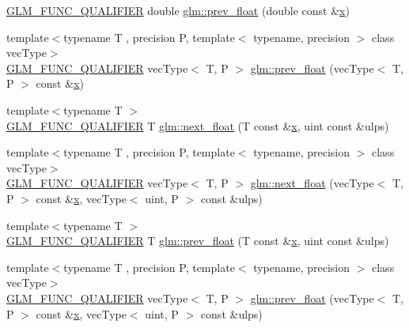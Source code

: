 \begin{DoxyCompactItemize}
\item 
\mbox{\hyperlink{setup_8hpp_a33fdea6f91c5f834105f7415e2a64407}{G\+L\+M\+\_\+\+F\+U\+N\+C\+\_\+\+Q\+U\+A\+L\+I\+F\+I\+ER}} double \mbox{\hyperlink{namespaceglm_a82cdd5674b80569f118b33a6a327c9bd}{glm\+::prev\+\_\+float}} (double const \&\mbox{\hyperlink{glad_8h_a92d0386e5c19fb81ea88c9f99644ab1d}{x}})
\item 
{\footnotesize template$<$typename T , precision P, template$<$ typename, precision $>$ class vec\+Type$>$ }\\\mbox{\hyperlink{setup_8hpp_a33fdea6f91c5f834105f7415e2a64407}{G\+L\+M\+\_\+\+F\+U\+N\+C\+\_\+\+Q\+U\+A\+L\+I\+F\+I\+ER}} vec\+Type$<$ T, P $>$ \mbox{\hyperlink{namespaceglm_a90916626e6b0ed925938226f31b38c6b}{glm\+::prev\+\_\+float}} (vec\+Type$<$ T, P $>$ const \&\mbox{\hyperlink{glad_8h_a92d0386e5c19fb81ea88c9f99644ab1d}{x}})
\item 
{\footnotesize template$<$typename T $>$ }\\\mbox{\hyperlink{setup_8hpp_a33fdea6f91c5f834105f7415e2a64407}{G\+L\+M\+\_\+\+F\+U\+N\+C\+\_\+\+Q\+U\+A\+L\+I\+F\+I\+ER}} T \mbox{\hyperlink{namespaceglm_ae4ffae05b7502be722f522c04f7e42ac}{glm\+::next\+\_\+float}} (T const \&\mbox{\hyperlink{glad_8h_a92d0386e5c19fb81ea88c9f99644ab1d}{x}}, uint const \&ulps)
\item 
{\footnotesize template$<$typename T , precision P, template$<$ typename, precision $>$ class vec\+Type$>$ }\\\mbox{\hyperlink{setup_8hpp_a33fdea6f91c5f834105f7415e2a64407}{G\+L\+M\+\_\+\+F\+U\+N\+C\+\_\+\+Q\+U\+A\+L\+I\+F\+I\+ER}} vec\+Type$<$ T, P $>$ \mbox{\hyperlink{namespaceglm_a3ad10c60be0fa0e754c8064ca13c4b91}{glm\+::next\+\_\+float}} (vec\+Type$<$ T, P $>$ const \&\mbox{\hyperlink{glad_8h_a92d0386e5c19fb81ea88c9f99644ab1d}{x}}, vec\+Type$<$ uint, P $>$ const \&ulps)
\item 
{\footnotesize template$<$typename T $>$ }\\\mbox{\hyperlink{setup_8hpp_a33fdea6f91c5f834105f7415e2a64407}{G\+L\+M\+\_\+\+F\+U\+N\+C\+\_\+\+Q\+U\+A\+L\+I\+F\+I\+ER}} T \mbox{\hyperlink{namespaceglm_a87ac8f75510274e112fe8512cfaa6935}{glm\+::prev\+\_\+float}} (T const \&\mbox{\hyperlink{glad_8h_a92d0386e5c19fb81ea88c9f99644ab1d}{x}}, uint const \&ulps)
\item 
{\footnotesize template$<$typename T , precision P, template$<$ typename, precision $>$ class vec\+Type$>$ }\\\mbox{\hyperlink{setup_8hpp_a33fdea6f91c5f834105f7415e2a64407}{G\+L\+M\+\_\+\+F\+U\+N\+C\+\_\+\+Q\+U\+A\+L\+I\+F\+I\+ER}} vec\+Type$<$ T, P $>$ \mbox{\hyperlink{namespaceglm_a742d4d85c23906178d1fd0c9fbab266c}{glm\+::prev\+\_\+float}} (vec\+Type$<$ T, P $>$ const \&\mbox{\hyperlink{glad_8h_a92d0386e5c19fb81ea88c9f99644ab1d}{x}}, vec\+Type$<$ uint, P $>$ const \&ulps)

\end{DoxyCompactItemize}
